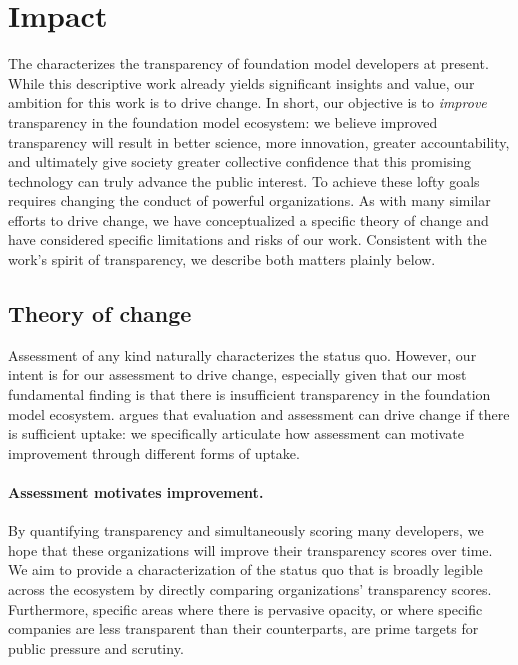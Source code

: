\hypertarget{impact}{\section{Impact}}
\label{sec:impact}
The \projectname characterizes the transparency of foundation model developers at present.
While this descriptive work already yields significant insights and value, our ambition for this work is to drive change. 
In short, our objective is to \textit{improve} transparency in the foundation model ecosystem: we believe improved transparency will result in better science, more innovation, greater accountability, and ultimately give society greater collective confidence that this promising technology can truly advance the public interest.
To achieve these lofty goals requires changing the conduct of powerful organizations.
As with many similar efforts to drive change, we have conceptualized a specific theory of change and have considered specific limitations and risks of our work.
Consistent with the work's spirit of transparency, we describe both matters plainly below. 

\hypertarget{change}{\subsection{Theory of change}}
\label{sec:change}
Assessment of any kind naturally characterizes the status quo.
However, our intent is for our assessment to drive change, especially given that our most fundamental finding is that there is insufficient transparency in the foundation model ecosystem.
\citet{bommasani2022evaluation} argues that evaluation and assessment can drive change if there is sufficient uptake: we specifically articulate how assessment can motivate improvement through different forms of uptake.

\paragraph{Assessment motivates improvement.}
By quantifying transparency and simultaneously scoring many developers, we hope that these organizations will improve their transparency scores over time.
We aim to provide a characterization of the status quo that is broadly legible across the ecosystem by directly comparing organizations' transparency scores. 
Furthermore, specific areas where there is pervasive opacity, or where specific companies are less transparent than their counterparts, are prime targets for public pressure and scrutiny. 

